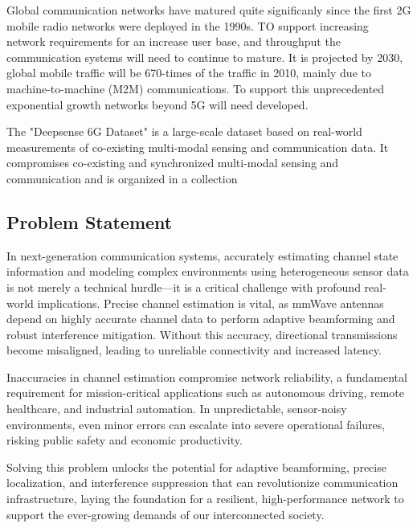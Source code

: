 \documentclass{UCF_ETD}
\begin{document}
Global communication networks have matured quite significanly since the first 2G mobile radio networks were deployed in the 1990s. TO support increasing network requirements for an increase user base, and throughput the communication systems will need to continue to mature. It is projected by 2030, global mobile traffic will be 670-times of the traffic in 2010, mainly due to machine-to-machine (M2M) communications. \cite{salameh20225g}\cite{ITU2370} To support this unprecedented exponential growth networks beyond 5G will need developed.


The "Deepsense 6G Dataset" is a large-scale dataset based on real-world measurements of co-existing multi-modal sensing and communication data. It compromises co-existing and synchronized multi-modal sensing and communication and is organized in a collection 
\cite{alkhateeb2023deepsense}


\subsection{Problem Statement}
In next-generation communication systems, accurately estimating channel state information and modeling complex environments using heterogeneous sensor data is not merely a technical hurdle—it is a critical challenge with profound real-world implications. Precise channel estimation is vital, as mmWave antennas depend on highly accurate channel data to perform adaptive beamforming and robust interference mitigation. Without this accuracy, directional transmissions become misaligned, leading to unreliable connectivity and increased latency.

Inaccuracies in channel estimation compromise network reliability, a fundamental requirement for mission-critical applications such as autonomous driving, remote healthcare, and industrial automation. In unpredictable, sensor-noisy environments, even minor errors can escalate into severe operational failures, risking public safety and economic productivity.

Solving this problem unlocks the potential for adaptive beamforming, precise localization, and interference suppression that can revolutionize communication infrastructure, laying the foundation for a resilient, high-performance network to support the ever-growing demands of our interconnected society.
\end{document}
